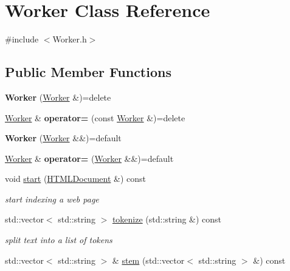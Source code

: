\hypertarget{classWorker}{}\section{Worker Class Reference}
\label{classWorker}


{\ttfamily \#include $<$Worker.\+h$>$}

\subsection*{Public Member Functions}
\begin{DoxyCompactItemize}
\item 
{\bfseries Worker} (\hyperlink{classWorker}{Worker} \&)=delete\hypertarget{classWorker_a0fb59883eb34da625420e40141dd29b2}{}\label{classWorker_a0fb59883eb34da625420e40141dd29b2}

\item 
\hyperlink{classWorker}{Worker} \& {\bfseries operator=} (const \hyperlink{classWorker}{Worker} \&)=delete\hypertarget{classWorker_aca397cd5d556133de9f7868127a920f5}{}\label{classWorker_aca397cd5d556133de9f7868127a920f5}

\item 
{\bfseries Worker} (\hyperlink{classWorker}{Worker} \&\&)=default\hypertarget{classWorker_a0c825b0d290c3c131f7a21758baefd66}{}\label{classWorker_a0c825b0d290c3c131f7a21758baefd66}

\item 
\hyperlink{classWorker}{Worker} \& {\bfseries operator=} (\hyperlink{classWorker}{Worker} \&\&)=default\hypertarget{classWorker_a3840f121930b58702dcba26b5e0dd83f}{}\label{classWorker_a3840f121930b58702dcba26b5e0dd83f}

\item 
void \hyperlink{classWorker_a251fee1d1e2715c5606939b5080c8488}{start} (\hyperlink{classHTMLDocument}{H\+T\+M\+L\+Document} \&) const 
\begin{DoxyCompactList}\small\item\em start indexing a web page \end{DoxyCompactList}\item 
std\+::vector$<$ std\+::string $>$ \hyperlink{classWorker_a25d6fba1b641c77bb0565df8b1de12ad}{tokenize} (std\+::string \&) const 
\begin{DoxyCompactList}\small\item\em split text into a list of tokens \end{DoxyCompactList}\item 
std\+::vector$<$ std\+::string $>$ \& \hyperlink{classWorker_addf90002a4063b5a8b23de39d151d19a}{stem} (std\+::vector$<$ std\+::string $>$ \&) const 
\end{DoxyCompactItemize}


